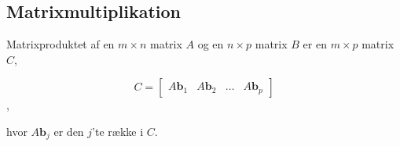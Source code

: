 \subsection{Matrixmultiplikation}


\begin{defn}
Matrixproduktet af en $m \times n$ matrix $A$ og en $n \times p$ matrix $B$ er en $m \times p$ matrix $C$, 

$$
C=
\begin{bmatrix}
A\textbf{b}_1 & A\textbf{b}_2 & \ldots & A\textbf{b}_p
\end{bmatrix}
$$,

hvor $A\textbf{b}_j$ er den $j$'te række i $C$.
\end{defn}

